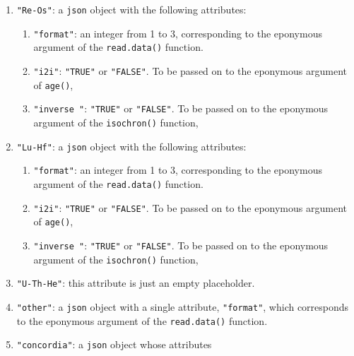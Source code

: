 \begin{refsection}
\begin{enumerate}[leftmargin=\parindent,align=left,
      labelwidth=\parindent,label*=2.\arabic*.]
\begin{enumerate}[leftmargin=\parindent,align=left,labelwidth=\parindent,label*=\arabic*.]
  \item{\tt "format"}: an integer from 1 to 3, corresponding to the
    eponymous argument of the \texttt{read.data()} function.
  \item{\tt "i2i"}: \texttt{"TRUE"} or \texttt{"FALSE"}. To be passed
    on to the eponymous argument of \texttt{age()},
  \item{\tt "inverse "}: \texttt{"TRUE"} or \texttt{"FALSE"}. To be
    passed on to the eponymous argument of the \texttt{isochron()}
    function,
  \end{enumerate}
\item{\tt "Re-Os"}: a \texttt{json} object with the following
  attributes:
  \begin{enumerate}[leftmargin=\parindent,align=left,labelwidth=\parindent,label*=\arabic*.]
  \item{\tt "format"}: an integer from 1 to 3, corresponding to the
    eponymous argument of the \texttt{read.data()} function.
  \item{\tt "i2i"}: \texttt{"TRUE"} or \texttt{"FALSE"}. To be passed
    on to the eponymous argument of \texttt{age()},
  \item{\tt "inverse "}: \texttt{"TRUE"} or \texttt{"FALSE"}. To be
    passed on to the eponymous argument of the \texttt{isochron()}
    function,
  \end{enumerate}
\item{\tt "Lu-Hf"}: a \texttt{json} object with the following
  attributes:
  \begin{enumerate}[leftmargin=\parindent,align=left,labelwidth=\parindent,label*=\arabic*.]
  \item{\tt "format"}: an integer from 1 to 3, corresponding to the
    eponymous argument of the \texttt{read.data()} function.
  \item{\tt "i2i"}: \texttt{"TRUE"} or \texttt{"FALSE"}. To be passed
    on to the eponymous argument of \texttt{age()},
  \item{\tt "inverse "}: \texttt{"TRUE"} or \texttt{"FALSE"}. To be
    passed on to the eponymous argument of the \texttt{isochron()}
    function,
  \end{enumerate}
\item{\tt "U-Th-He"}: this attribute is just an empty placeholder.
\item{\tt "other"}: a \texttt{json} object with a single attribute,
  \texttt{"format"}, which corresponds to the eponymous argument of
    the \texttt{read.data()} function.
  \item{\tt "concordia"}: a \texttt{json} object whose attributes

\end{enumerate}
\end{refsection}
